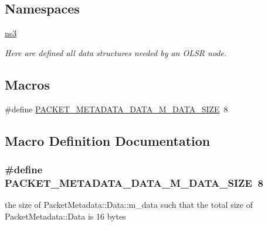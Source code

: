 \subsection*{Namespaces}
\begin{DoxyCompactItemize}
\item 
 \hyperlink{namespacens3}{ns3}
\begin{DoxyCompactList}\small\item\em Here are defined all data structures needed by an O\+L\+SR node. \end{DoxyCompactList}\end{DoxyCompactItemize}
\subsection*{Macros}
\begin{DoxyCompactItemize}
\item 
\#define \hyperlink{packet-metadata_8h_a6e9dfb20738a271bc45a4c2929a9a500}{P\+A\+C\+K\+E\+T\+\_\+\+M\+E\+T\+A\+D\+A\+T\+A\+\_\+\+D\+A\+T\+A\+\_\+\+M\+\_\+\+D\+A\+T\+A\+\_\+\+S\+I\+ZE}~8
\end{DoxyCompactItemize}


\subsection{Macro Definition Documentation}
\subsubsection[{\texorpdfstring{P\+A\+C\+K\+E\+T\+\_\+\+M\+E\+T\+A\+D\+A\+T\+A\+\_\+\+D\+A\+T\+A\+\_\+\+M\+\_\+\+D\+A\+T\+A\+\_\+\+S\+I\+ZE}{PACKET_METADATA_DATA_M_DATA_SIZE}}]{\setlength{\rightskip}{0pt plus 5cm}\#define P\+A\+C\+K\+E\+T\+\_\+\+M\+E\+T\+A\+D\+A\+T\+A\+\_\+\+D\+A\+T\+A\+\_\+\+M\+\_\+\+D\+A\+T\+A\+\_\+\+S\+I\+ZE~8}\hypertarget{packet-metadata_8h_a6e9dfb20738a271bc45a4c2929a9a500}{}\label{packet-metadata_8h_a6e9dfb20738a271bc45a4c2929a9a500}
the size of Packet\+Metadata\+::\+Data\+::m\+\_\+data such that the total size of Packet\+Metadata\+::\+Data is 16 bytes 
